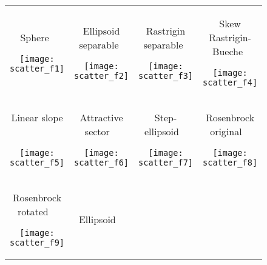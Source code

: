 \documentclass{sig-alternate}
\begin{document}
\begin{figure*}
\begin{tabular}{*{4}{@{}c@{}}}
\begin{turn}{90}\parbox{0.21\textwidth}{\hfill{} Sphere\hfill~}\end{turn} 
    \texttt{[image: scatter\_f1]}&
\begin{turn}{90}\parbox{0.21\textwidth}{\hfill{} Ellipsoid separable\hfill~}\end{turn} 
    \texttt{[image: scatter\_f2]}&
\begin{turn}{90}\parbox{0.21\textwidth}{\hfill{} Rastrigin separable\hfill~}\end{turn} 
    \texttt{[image: scatter\_f3]}&
\begin{turn}{90}\parbox{0.21\textwidth}{\hfill{} Skew Rastrigin-Bueche\hfill~}\end{turn} 
    \texttt{[image: scatter\_f4]}\\[-2.2ex]
\begin{turn}{90}\parbox{0.21\textwidth}{\hfill{} Linear slope \hfill~}\end{turn} 
    \texttt{[image: scatter\_f5]}&
\begin{turn}{90}\parbox{0.21\textwidth}{\hfill{} Attractive sector \hfill~}\end{turn} 
    \texttt{[image: scatter\_f6]}&
\begin{turn}{90}\parbox{0.21\textwidth}{\hfill{} Step-ellipsoid \hfill~}\end{turn} 
    \texttt{[image: scatter\_f7]}&
\begin{turn}{90}\parbox{0.21\textwidth}{\hfill{} Rosenbrock original \hfill~}\end{turn} 
    \texttt{[image: scatter\_f8]}\\[-2.2ex]
\begin{turn}{90}\parbox{0.21\textwidth}{\hfill{} Rosenbrock rotated \hfill~}\end{turn} 
    \texttt{[image: scatter\_f9]}&
\begin{turn}{90}\parbox{0.21\textwidth}{\hfill{} Ellipsoid \hfill~}\end{turn} 

\end{tabular}
\end{figure*}
\end{document}
